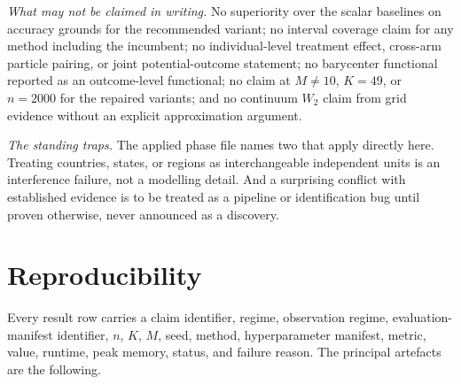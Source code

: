 \documentclass[11pt,a4paper]{article}
\theoremstyle{definition}
\theoremstyle{remark}
\begin{document}
\emph{What may not be claimed in writing.} No superiority over the scalar
baselines on accuracy grounds for the recommended variant; no interval coverage
claim for any method including the incumbent; no individual-level treatment
effect, cross-arm particle pairing, or joint potential-outcome statement; no
barycenter functional reported as an outcome-level functional; no claim at $M
\neq 10$, $K = 49$, or $n = 2000$ for the repaired variants; and no continuum
$W_2$ claim from grid evidence without an explicit approximation argument.

\emph{The standing traps.} The applied phase file names two that apply directly
here. Treating countries, states, or regions as interchangeable independent units
is an interference failure, not a modelling detail. And a surprising conflict with
established evidence is to be treated as a pipeline or identification bug until
proven otherwise, never announced as a discovery.

\section{Reproducibility}

Every result row carries a claim identifier, regime, observation regime,
evaluation-manifest identifier, $n$, $K$, $M$, seed, method, hyperparameter
manifest, metric, value, runtime, peak memory, status, and failure reason. The
principal artefacts are the following.
\end{document}
